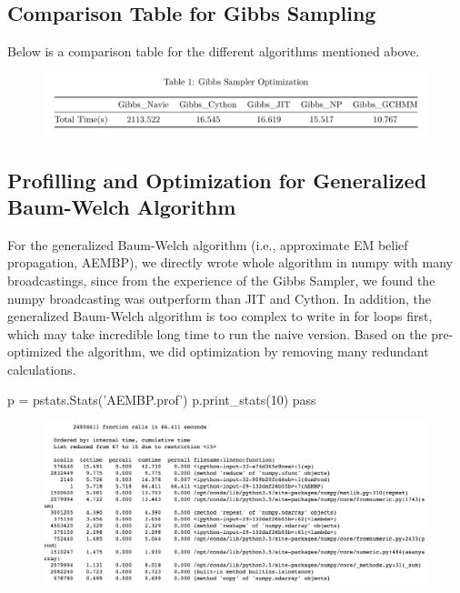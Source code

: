 \documentclass{article} %
\begin{document}
\subsection{Comparison Table for Gibbs Sampling}
Below is a comparison table for the different algorithms mentioned above.
\begin{figure}[htpb]
\centering
\includegraphics[width=120mm]{Gibbs.png}
\end{figure}

\subsection{Profilling and Optimization for Generalized Baum-Welch Algorithm}
For the generalized Baum-Welch algorithm (i.e., approximate EM belief propagation, AEMBP), we directly wrote whole algorithm in numpy with many broadcastings, since from the experience of the Gibbs Sampler, we found the numpy broadcasting was outperform than JIT and Cython. In addition, the generalized Baum-Welch algorithm is too complex to write in for loops first, which may take incredible long time to run the naive version. Based on the pre-optimized the algorithm, we did optimization by removing many redundant calculations. 

\begin{python}
p = pstats.Stats('AEMBP.prof')
p.print_stats(10)
pass
\end{python}
\begin{figure}[htpb]
\centering
\includegraphics[width=170mm]{AEMBP_profile.png}
\end{figure}
\end{document}
